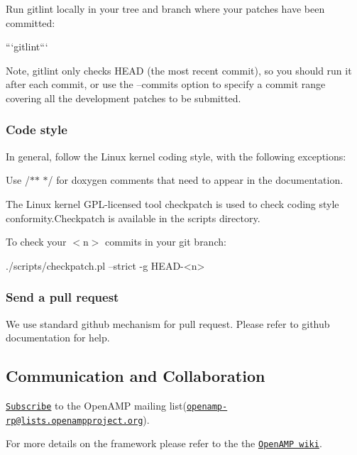 Run gitlint locally in your tree and branch where your patches have been committed\+: \begin{DoxyVerb}  ```gitlint```
\end{DoxyVerb}
 Note, gitlint only checks H\+E\+AD (the most recent commit), so you should run it after each commit, or use the --commits option to specify a commit range covering all the development patches to be submitted.

\subsubsection*{Code style}

In general, follow the Linux kernel coding style, with the following exceptions\+:


\begin{DoxyItemize}
\item Use /$\ast$$\ast$ $\ast$/ for doxygen comments that need to appear in the documentation.
\end{DoxyItemize}

The Linux kernel G\+P\+L-\/licensed tool checkpatch is used to check coding style conformity.\+Checkpatch is available in the scripts directory.

To check your $<$n$>$ commits in your git branch\+: 
\begin{DoxyCode}
./scripts/checkpatch.pl --strict  -g HEAD-<n>
\end{DoxyCode}
 \subsubsection*{Send a pull request}

We use standard github mechanism for pull request. Please refer to github documentation for help.

\subsection*{Communication and Collaboration}

\href{https://lists.openampproject.org/mailman3/lists/openamp-rp.lists.openampproject.org/}{\tt Subscribe} to the Open\+A\+MP mailing list(\href{mailto:openamp-rp@lists.openampproject.org}{\tt openamp-\/rp@lists.\+openampproject.\+org}).

For more details on the framework please refer to the the \href{https://github.com/OpenAMP/open-amp/wiki}{\tt Open\+A\+MP wiki}. 